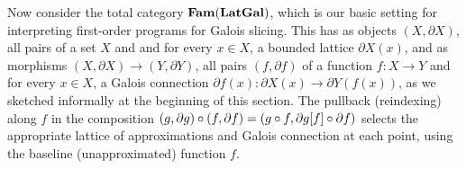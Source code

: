 Now consider the total category $\mathbf{Fam}(\mathbf{LatGal})$, which is our basic setting for interpreting first-order
programs for Galois slicing. This has as objects $(X, \partial X)$, all pairs of a set $X$ and and for every
$x \in X$, a bounded lattice $\partial X(x)$, and as morphisms $(X, \partial X) \to (Y, \partial Y)$, all
pairs $(f, \partial f)$ of a function $f: X \to Y$ and for every $x \in X$, a Galois connection $\partial
f(x): \partial X(x) \to \partial Y(f(x))$, as we sketched informally at the beginning of this section. The
pullback (reindexing) along $f$ in the composition $(g, \partial g) \circ (f, \partial f) = (g \circ f,
\partial g[f] \circ \partial f)$ selects the appropriate lattice of approximations and Galois
connection at each point, using the baseline (unapproximated) function $f$.
